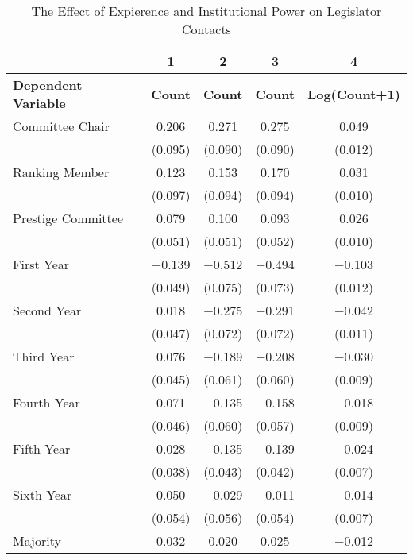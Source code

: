 \begin{table}

\caption{\label{tab:models_total}The Effect of Expierence and Institutional Power on Legislator Contacts}
\centering
\fontsize{11}{13}\selectfont
\begin{tabular}[t]{lcccc}
\toprule
  & 1 & 2 & 3 & 4\\
\midrule
\textbf{Dependent Variable} & \textbf{Count} & \textbf{Count} & \textbf{Count} & \textbf{Log(Count+1)}\\
\midrule
Committee Chair & \num{0.206} & \num{0.271} & \num{0.275} & \num{0.049}\\
 & (\num{0.095}) & (\num{0.090}) & (\num{0.090}) & (\num{0.012})\\
Ranking Member & \num{0.123} & \num{0.153} & \num{0.170} & \num{0.031}\\
 & (\num{0.097}) & (\num{0.094}) & (\num{0.094}) & (\num{0.010})\\
Prestige Committee & \num{0.079} & \num{0.100} & \num{0.093} & \num{0.026}\\
 & (\num{0.051}) & (\num{0.051}) & (\num{0.052}) & (\num{0.010})\\
First Year & \num{-0.139} & \num{-0.512} & \num{-0.494} & \num{-0.103}\\
 & (\num{0.049}) & (\num{0.075}) & (\num{0.073}) & (\num{0.012})\\
Second Year & \num{0.018} & \num{-0.275} & \num{-0.291} & \num{-0.042}\\
 & (\num{0.047}) & (\num{0.072}) & (\num{0.072}) & (\num{0.011})\\
Third Year & \num{0.076} & \num{-0.189} & \num{-0.208} & \num{-0.030}\\
 & (\num{0.045}) & (\num{0.061}) & (\num{0.060}) & (\num{0.009})\\
Fourth Year & \num{0.071} & \num{-0.135} & \num{-0.158} & \num{-0.018}\\
 & (\num{0.046}) & (\num{0.060}) & (\num{0.057}) & (\num{0.009})\\
Fifth Year & \num{0.028} & \num{-0.135} & \num{-0.139} & \num{-0.024}\\
 & (\num{0.038}) & (\num{0.043}) & (\num{0.042}) & (\num{0.007})\\
Sixth Year & \num{0.050} & \num{-0.029} & \num{-0.011} & \num{-0.014}\\
 & (\num{0.054}) & (\num{0.056}) & (\num{0.054}) & (\num{0.007})\\
Majority & \num{0.032} & \num{0.020} & \num{0.025} & \num{-0.012}\\

\end{tabular}
\end{table}
